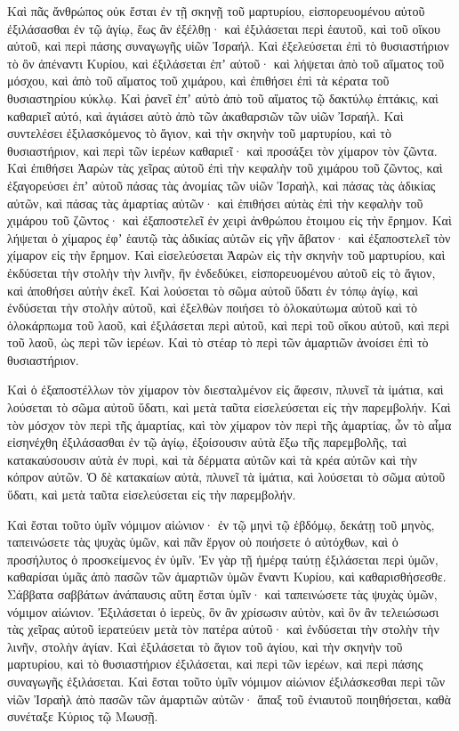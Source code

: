 {Καὶ πᾶς ἄνθρώπος οὐκ ἔσται ἐν τῇ σκηνῇ τοῦ μαρτυρίου, εἰσπορευομένου αὐτοῦ ἐξιλάσασθαι ἐν τῷ ἁγίῳ, ἕως ἂν ἐξέλθῃ· καὶ ἐξιλάσεται περὶ ἑαυτοῦ, καὶ τοῦ οἴκου αὐτοῦ, καὶ περὶ πάσης συναγωγῆς υἱῶν Ἰσραήλ.
Καὶ ἐξελεύσεται ἐπὶ τὸ θυσιαστήριον τὸ ὂν ἀπέναντι Κυρίου, καὶ ἐξιλάσεται ἐπʼ αὐτοῦ· καὶ λήψεται ἀπὸ τοῦ αἵματος τοῦ μόσχου, καὶ ἀπὸ τοῦ αἵματος τοῦ χιμάρου, καὶ ἐπιθήσει ἐπὶ τὰ κέρατα τοῦ θυσιαστηρίου κύκλῳ.
Καὶ ῥανεῖ ἐπʼ αὐτὸ ἀπὸ τοῦ αἵματος τῷ δακτύλῳ ἑπτάκις, καὶ καθαριεῖ αὐτό, καὶ ἁγιάσει αὐτὸ ἀπὸ τῶν ἀκαθαρσιῶν τῶν υἱῶν Ἰσραήλ.
Καὶ συντελέσει ἐξιλασκόμενος τὸ ἅγιον, καὶ τὴν σκηνὴν τοῦ μαρτυρίου, καὶ τὸ θυσιαστήριον, καὶ περὶ τῶν ἱερέων καθαριεῖ· καὶ προσάξει τὸν χίμαρον τὸν ζῶντα.
Καὶ ἐπιθήσει Ἀαρὼν τὰς χεῖρας αὐτοῦ ἐπὶ τὴν κεφαλὴν τοῦ χιμάρου τοῦ ζῶντος, καὶ ἐξαγορεύσει ἐπʼ αὐτοῦ πάσας τὰς ἀνομίας τῶν υἱῶν Ἰσραὴλ, καὶ πάσας τὰς ἀδικίας αὐτῶν, καὶ πάσας τὰς ἁμαρτίας αὐτῶν· καὶ ἐπιθήσει αὐτὰς ἐπὶ τὴν κεφαλὴν τοῦ χιμάρου τοῦ ζῶντος· καὶ ἐξαποστελεῖ ἐν χειρὶ ἀνθρώπου ἑτοιμου εἰς τὴν ἔρημον.
Καὶ λήψεται ὁ χίμαρος ἐφʼ ἑαυτῷ τὰς ἀδικίας αὐτῶν εἰς γῆν ἄβατον· καὶ ἐξαποστελεῖ τὸν χίμαρον εἰς τὴν ἔρημον.
Καὶ εἰσελεύσεται Ἀαρὼν εἰς τὴν σκηνὴν τοῦ μαρτυρίου, καὶ ἐκδύσεται τὴν στολὴν τὴν λινῆν, ἣν ἐνδεδύκει, εἰσπορευομένου αὐτοῦ εἰς τὸ ἅγιον, καὶ ἀποθήσει αὐτὴν ἐκεῖ.
Καὶ λούσεται τὸ σῶμα αὐτοῦ ὕδατι ἐν τόπῳ ἁγίῳ, καὶ ἐνδύσεται τὴν στολὴν αὐτοῦ, καὶ ἐξελθὼν ποιήσει τὸ ὁλοκαύτωμα αὐτοῦ καὶ τὸ ὁλοκάρπωμα τοῦ λαοῦ, καὶ ἐξιλάσεται περὶ αὐτοῦ, καὶ περὶ τοῦ οἴκου αὐτοῦ, καὶ περὶ τοῦ λαοῦ, ὡς περὶ τῶν ἱερέων.
Καὶ τὸ στέαρ τὸ περὶ τῶν ἁμαρτιῶν ἀνοίσει ἐπὶ τὸ θυσιαστήριον.
\par }{\PP {}Καὶ ὁ ἐξαποστέλλων τὸν χίμαρον τὸν διεσταλμένον εἰς ἄφεσιν, πλυνεῖ τὰ ἱμάτια, καὶ λούσεται τὸ σῶμα αὐτοῦ ὕδατι, καὶ μετὰ ταῦτα εἰσελεύσεται εἰς τὴν παρεμβολήν.
Καὶ τὸν μόσχον τὸν περὶ τῆς ἁμαρτίας, καὶ τὸν χίμαρον τὸν περὶ τῆς ἁμαρτίας, ὧν τὸ αἷμα εἰσηνέχθη ἐξιλάσασθαι ἐν τῷ ἁγίῳ, ἐξοίσουσιν αὐτὰ ἔξω τῆς παρεμβολῆς, ταὶ κατακαύσουσιν αὐτὰ ἐν πυρὶ, καὶ τὰ δέρματα αὐτῶν καὶ τὰ κρέα αὐτῶν καὶ τὴν κόπρον αὐτῶν.
Ὁ δὲ κατακαίων αὐτὰ, πλυνεῖ τὰ ἱμάτια, καὶ λούσεται τὸ σῶμα αὐτοῦ ὕδατι, καὶ μετὰ ταῦτα εἰσελεύσεται εἰς τὴν παρεμβολήν.
\par }{\PP {}Καὶ ἔσται τοῦτο ὑμῖν νόμιμον αἰώνιον· ἐν τῷ μηνὶ τῷ ἑβδόμῳ, δεκάτῃ τοῦ μηνὸς, ταπεινώσετε τὰς ψυχὰς ὑμῶν, καὶ πᾶν ἔργον οὐ ποιήσετε ὁ αὐτόχθων, καὶ ὁ προσήλυτος ὁ προσκείμενος ἐν ὑμῖν.
Ἐν γὰρ τῇ ἡμέρᾳ ταύτῃ ἐξιλάσεται περὶ ὑμῶν, καθαρίσαι ὑμᾶς ἀπὸ πασῶν τῶν ἁμαρτιῶν ὑμῶν ἔναντι Κυρίου, καὶ καθαρισθήσεσθε.
Σάββατα σαββάτων ἀνάπαυσις αὕτη ἔσται ὑμῖν· καὶ ταπεινώσετε τὰς ψυχὰς ὑμῶν, νόμιμον αἰώνιον.
Ἐξιλάσεται ὁ ἱερεὺς, ὃν ἂν χρίσωσιν αὐτὸν, καὶ ὃν ἂν τελειώσωσι τὰς χεῖρας αὐτοῦ ἱερατεύειν μετὰ τὸν πατέρα αὐτοῦ· καὶ ἐνδύσεται τὴν στολὴν τὴν λινῆν, στολὴν ἁγίαν.
Καὶ ἐξιλάσεται τὸ ἅγιον τοῦ ἁγίου, καὶ τὴν σκηνὴν τοῦ μαρτυρίου, καὶ τὸ θυσιαστήριον ἐξιλάσεται, καὶ περὶ τῶν ἱερέων, καὶ περὶ πάσης συναγωγῆς ἐξιλάσεται.
Καὶ ἔσται τοῦτο ὑμῖν νόμιμον αἰώνιον ἐξιλάσκεσθαι περὶ τῶν νἱῶν Ἰσραὴλ ἀπὸ πασῶν τῶν ἁμαρτιῶν αὐτῶν· ἅπαξ τοῦ ἐνιαυτοῦ ποιηθήσεται, καθὰ συνέταξε Κύριος τῷ Μωυσῇ.

}
